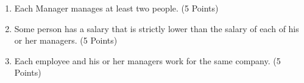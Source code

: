 \documentclass{article}
\begin{document}
\begin{enumerate}[resume]

\item  Each Manager manages at least two people. (5 Points)

\item  Some person has a salary that is strictly lower than the salary of each of his or her managers. (5 Points)

\item  Each employee and his or her managers work for the same company. (5 Points)


\end{enumerate}
\end{document}
